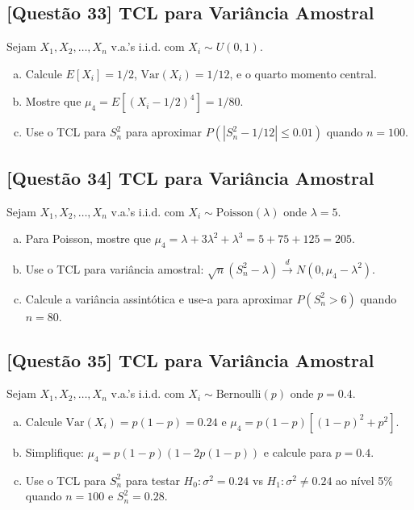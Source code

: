 \documentclass[12pt,a4paper]{article}
\begin{document}
\subsection*{[Questão 33] TCL para Variância Amostral}

Sejam $X_1, X_2, \ldots, X_n$ v.a.'s i.i.d. com $X_i \sim U(0, 1)$.

\begin{enumerate}[(a)]
    \item Calcule $E[X_i] = 1/2$, $\text{Var}(X_i) = 1/12$, e o quarto momento central.
    \item Mostre que $\mu_4 = E[(X_i - 1/2)^4] = 1/80$.
    \item Use o TCL para $S_n^2$ para aproximar $P(|S_n^2 - 1/12| \leq 0.01)$ quando $n = 100$.
\end{enumerate}

\subsection*{[Questão 34] TCL para Variância Amostral}

Sejam $X_1, X_2, \ldots, X_n$ v.a.'s i.i.d. com $X_i \sim \text{Poisson}(\lambda)$ onde $\lambda = 5$.

\begin{enumerate}[(a)]
    \item Para Poisson, mostre que $\mu_4 = \lambda + 3\lambda^2 + \lambda^3 = 5 + 75 + 125 = 205$.
    \item Use o TCL para variância amostral: $\sqrt{n}(S_n^2 - \lambda) \xrightarrow{d} N(0, \mu_4 - \lambda^2)$.
    \item Calcule a variância assintótica e use-a para aproximar $P(S_n^2 > 6)$ quando $n = 80$.
\end{enumerate}

\subsection*{[Questão 35] TCL para Variância Amostral}

Sejam $X_1, X_2, \ldots, X_n$ v.a.'s i.i.d. com $X_i \sim \text{Bernoulli}(p)$ onde $p = 0.4$.

\begin{enumerate}[(a)]
    \item Calcule $\text{Var}(X_i) = p(1-p) = 0.24$ e $\mu_4 = p(1-p)[(1-p)^2 + p^2]$.
    \item Simplifique: $\mu_4 = p(1-p)(1-2p(1-p))$ e calcule para $p = 0.4$.
    \item Use o TCL para $S_n^2$ para testar $H_0: \sigma^2 = 0.24$ vs $H_1: \sigma^2 \neq 0.24$ ao nível 5\% quando $n = 100$ e $S_n^2 = 0.28$.
\end{enumerate}
\end{document}
